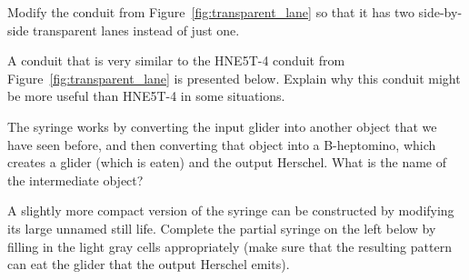 \begin{multicols}{2}
\mfilbreak


\begin{problem}\label{exer:two_transparent_lanes}
	Modify the conduit from Figure~\ref{fig:transparent_lane} so that it has two side-by-side transparent lanes instead of just one.
	
\end{problem}


\mfilbreak


\begin{problem}\label{exer:H_to_G_transparent_better}
	A conduit that is very similar to the HNE5T-4 conduit from Figure~\ref{fig:transparent_lane} is presented below. Explain why this conduit might be more useful than HNE5T-4 in some situations.

	\begin{center}
	\end{center}
\end{problem}


\mfilbreak
	
	
\begin{problem}\label{exer:syringe_creates_pi}
	The syringe works by converting the input glider into another object that we have seen before, and then converting that object into a B-heptomino, which creates a glider (which is eaten) and the output Herschel. What is the name of the intermediate object?
\end{problem}


\mfilbreak


\begin{problem}\label{exer:syringe_compact}
	A slightly more compact version of the syringe can be constructed by modifying its large unnamed still life. Complete the partial syringe on the left below by filling in the light gray cells appropriately (make sure that the resulting pattern can eat the glider that the output Herschel emits).
	
	\vspace*{-0.4cm}
	
	\begin{center}
		~\quad~
	\end{center}
\end{problem}
	

\end{multicols}
